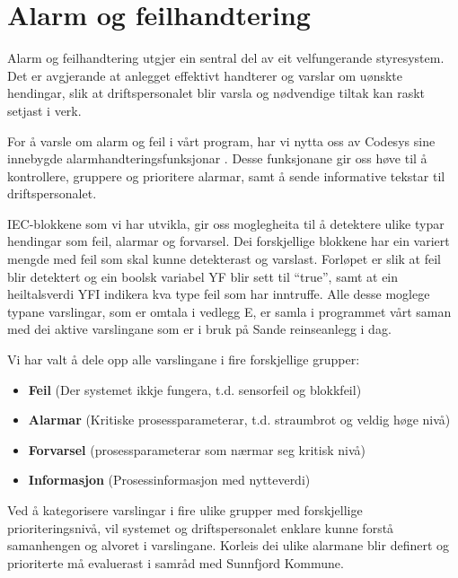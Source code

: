 \newpage
\section{Alarm og feilhandtering}
\thispagestyle{fancy}

Alarm og feilhandtering utgjer ein sentral del av eit velfungerande styresystem. Det er avgjerande
at anlegget effektivt handterer og varslar om uønskte hendingar, slik at 
driftspersonalet blir varsla og nødvendige tiltak kan raskt setjast i verk.

For å varsle om alarm og feil i vårt program, har vi nytta oss av \gls{Codesys} sine
innebygde alarmhandteringsfunksjonar \citep{CodesysAlarm}. Desse funksjonane gir oss høve til å 
kontrollere, gruppere og prioritere alarmar, samt å sende informative tekstar til driftspersonalet.

\gls{IEC}-blokkene som vi har utvikla, gir oss moglegheita til å detektere ulike typar hendingar
som feil, alarmar og forvarsel.
Dei forskjellige blokkene har ein variert mengde med feil som skal kunne detekterast og varslast.
Forløpet er slik at feil blir detektert og ein boolsk variabel \gls{YF} blir sett til ``true'', 
samt at ein heiltalsverdi \gls{YFI} indikera kva type feil som har inntruffe.\newline
Alle desse moglege typane varslingar, som er omtala i vedlegg E, 
er samla i programmet vårt saman 
med dei aktive varslingane som er i bruk på Sande reinseanlegg i dag.

Vi har valt å dele opp alle varslingane i fire forskjellige grupper:

\begin{itemize}
    \item \textbf{Feil}          (Der systemet ikkje fungera, t.d. sensorfeil og blokkfeil)
    \item \textbf{Alarmar}       (Kritiske prosessparameterar, t.d. straumbrot og veldig høge nivå)
    \item \textbf{Forvarsel}     (prosessparameterar som nærmar seg kritisk nivå)
    \item \textbf{Informasjon}   (Prosessinformasjon med nytteverdi)
\end{itemize}

Ved å kategorisere varslingar i fire ulike grupper med forskjellige prioriteringsnivå,
vil systemet og driftspersonalet enklare kunne forstå samanhengen og alvoret i varslingane. \newline
Korleis dei ulike alarmane blir definert og prioriterte må evaluerast i samråd med \gls{Sunnfjord Kommune}.

\newpage


